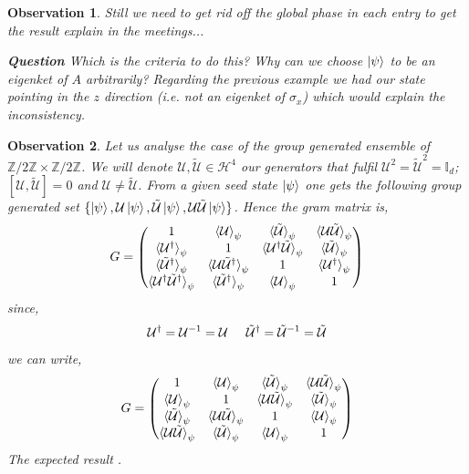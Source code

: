 \documentclass[12pt,letterpaper]{article}
\newtheorem{observation}{Observation}
\begin{document}
\begin{multicols}{2}
\begin{observation}
Still we need to get rid off the global phase in each entry to get the result explain in the meetings... \par
\textbf{Question} Which is the criteria to do this? Why can we choose $\ket{\psi}$ to be an eigenket of $A$ arbitrarily? Regarding the previous example we had our state pointing in the $z$ direction (i.e. not an eigenket of $\sigma_x$) which would explain the inconsistency.
\end{observation}
\begin{observation}
Let us analyse the case of the group generated ensemble of $\mathbb{Z}/2\mathbb{Z}\times\mathbb{Z}/2\mathbb{Z}$. We will denote $\mathcal{U},\tilde{\mathcal{U}}\in\mathcal{H}^4$ our generators that fulfil $\mathcal{U}^2=\tilde{\mathcal{U}}^2=\mathbb{I}_d$; $[\mathcal{U},\tilde{\mathcal{U}}]=0$ and $\mathcal{U}\neq\tilde{\mathcal{U}}$. From a given seed state $\ket{\psi}$ one gets the following group generated set $\{\ket{\psi},\mathcal{U}\ket{\psi},\tilde{\mathcal{U}}\ket{\psi},\mathcal{U}\tilde{\mathcal{U}}\ket{\psi}\}$. Hence the gram matrix is,
\begin{align}
G=\begin{pmatrix}
1 & \braket{\mathcal{U}}_\psi & \braket{\tilde{\mathcal{U}}}_\psi &  \braket{\mathcal{U}\tilde{\mathcal{U}}}_\psi \\
\braket{\mathcal{U}^\dagger}_\psi & 1 &  \braket{\mathcal{U}^\dagger\tilde{\mathcal{U}}}_\psi & \braket{\tilde{\mathcal{U}}}_\psi \\
 \braket{\tilde{\mathcal{U}}^\dagger}_\psi &  \braket{\mathcal{U}\tilde{\mathcal{U}}^\dagger}_\psi & 1 & \braket{\mathcal{U}^\dagger}_\psi \\
\braket{\mathcal{U}^\dagger\tilde{\mathcal{U}}^\dagger}_\psi & \braket{\tilde{\mathcal{U}}^\dagger}_\psi & \braket{\mathcal{U}}_\psi &  1
\end{pmatrix}
\end{align}
since,
\begin{align}
\mathcal{U}^\dagger=\mathcal{U}^{-1}=\mathcal{U}\hspace{0.5cm}\tilde{\mathcal{U}}^\dagger=\tilde{\mathcal{U}}^{-1}=\tilde{\mathcal{U}}
\end{align}
we can write,
\begin{align}
G=\begin{pmatrix}
1 & \braket{\mathcal{U}}_\psi & \braket{\tilde{\mathcal{U}}}_\psi &  \braket{\mathcal{U}\tilde{\mathcal{U}}}_\psi \\
\braket{\mathcal{U}}_\psi & 1 &  \braket{\mathcal{U}\tilde{\mathcal{U}}}_\psi & \braket{\tilde{\mathcal{U}}}_\psi \\
 \braket{\tilde{\mathcal{U}}}_\psi &  \braket{\mathcal{U}\tilde{\mathcal{U}}}_\psi & 1 & \braket{\mathcal{U}}_\psi \\
\braket{\mathcal{U}\tilde{\mathcal{U}}}_\psi & \braket{\tilde{\mathcal{U}}}_\psi & \braket{\mathcal{U}}_\psi &  1
\end{pmatrix}
\end{align}
The expected result .
\end{observation}


\end{multicols}
\end{document}
